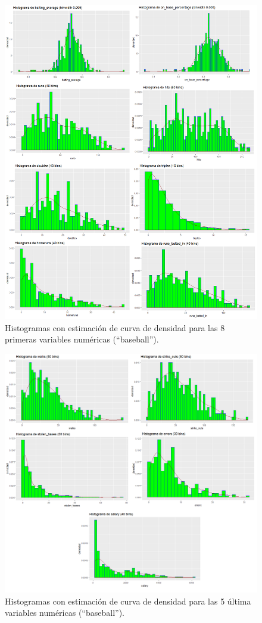 \documentclass[a4paper,12pt, oneside]{book}
\begin{document}
\begin{figure}[H]
\centering
\includegraphics[scale=0.45]{images/histogram1.png}
\caption{Histogramas con estimación de curva de densidad para las 8 primeras variables numéricas (``baseball'').}
\end{figure}

\begin{figure}[H]
\centering
\includegraphics[scale=0.45]{images/histogram2.png}
\caption{Histogramas con estimación de curva de densidad para las 5 última variables numéricas (``baseball'').}
\end{figure}
\end{document}
